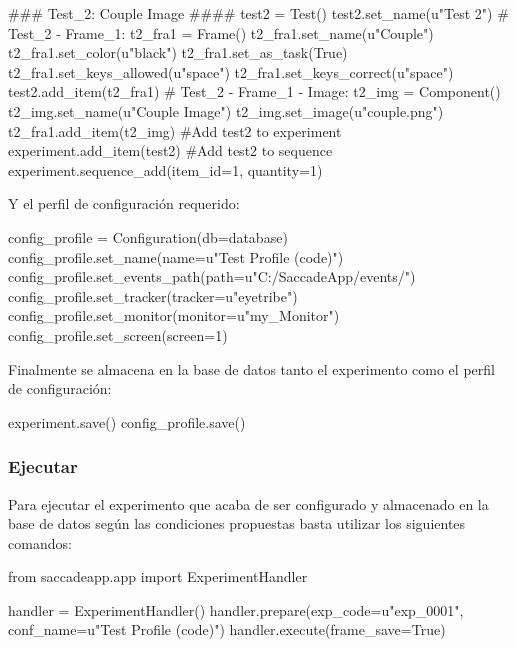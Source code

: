 \documentclass[\main/main.tex]{subfiles}
\begin{document}
\begin{singlespace}\begin{python}
### Test_2: Couple Image ####
test2 = Test()
test2.set_name(u"Test 2")
# Test_2 - Frame_1: 
t2_fra1 = Frame()
t2_fra1.set_name(u"Couple")
t2_fra1.set_color(u"black")
t2_fra1.set_as_task(True)
t2_fra1.set_keys_allowed(u"space")
t2_fra1.set_keys_correct(u"space")
test2.add_item(t2_fra1)
# Test_2 - Frame_1 - Image:
t2_img = Component()
t2_img.set_name(u"Couple Image")
t2_img.set_image(u"couple.png")
t2_fra1.add_item(t2_img)
#Add test2 to experiment
experiment.add_item(test2)
#Add test2 to sequence
experiment.sequence_add(item_id=1, quantity=1)
\end{python}\end{singlespace}

                Y el perfil de configuración requerido:
\begin{singlespace}\begin{python}
config_profile = Configuration(db=database)
config_profile.set_name(name=u"Test Profile (code)")
config_profile.set_events_path(path=u"C:/SaccadeApp/events/")
config_profile.set_tracker(tracker=u"eyetribe")
config_profile.set_monitor(monitor=u"my_Monitor")
config_profile.set_screen(screen=1)
\end{python}\end{singlespace}
    
                Finalmente se almacena en la base de datos tanto el experimento como el perfil de configuración:
\begin{singlespace}\begin{python}
experiment.save()
config_profile.save()
\end{python}\end{singlespace}

            \subsubsection{Ejecutar}
                Para ejecutar el experimento que acaba de ser configurado y almacenado en la base de datos según las condiciones propuestas basta utilizar los siguientes comandos:
\begin{singlespace}\begin{python}
from saccadeapp.app import ExperimentHandler

handler = ExperimentHandler()
handler.prepare(exp_code=u"exp_0001", conf_name=u"Test Profile (code)")
handler.execute(frame_save=True)
\end{python}\end{singlespace}
\end{document}
